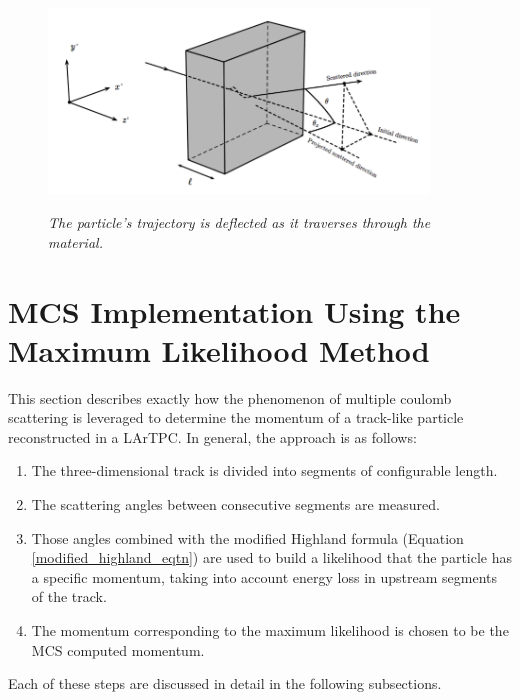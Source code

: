 \documentclass[a4paper,11pt]{article}
\begin{document}
\begin{figure}[ht!]
\centering
	\includegraphics[width=0.9\textwidth]{Figures/static_figs/mcs_nocap.png} \\
\caption{\textit{The particle's trajectory is deflected as it traverses through the material.}}\label{mcs_nocap_fig}
\end{figure}

























\section{MCS Implementation Using the Maximum Likelihood Method}\label{MCS_technique_section}

This section describes exactly how the phenomenon of multiple coulomb scattering is leveraged to determine the momentum of a track-like particle reconstructed in a LArTPC. In general, the approach is as follows:
\begin{enumerate}
\item The three-dimensional track is divided into segments of configurable length.
\item The scattering angles between consecutive segments are measured.
\item Those angles combined with the modified Highland formula (Equation \ref{modified_highland_eqtn}) are used to build a likelihood that the particle has a specific momentum, taking into account energy loss in upstream segments of the track.
\item The momentum corresponding to the maximum likelihood is chosen to be the MCS computed momentum.
\end{enumerate}
Each of these steps are discussed in detail in the following subsections.\\
\end{document}
